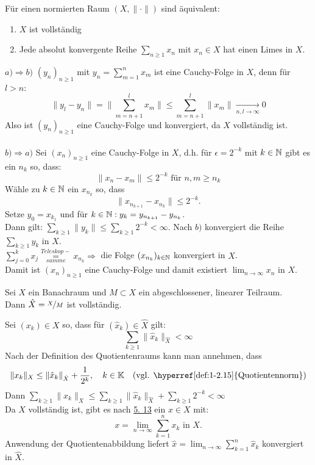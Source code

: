 \begin{lemma} \label{lemma:5.13}
	Für einen normierten Raum $(X, \| \cdot \|)$ sind äquivalent:
	\begin{enumerate}[label=\alph*\upshape)]
		\item $X$ ist vollständig
		\item Jede absolut konvergente Reihe $\sum_{n \geq 1} x_{n}$ mit $x_{n} \in X$ hat einen Limes in $X$.
	\end{enumerate}	
\end{lemma}

\begin{beweis}
	$a) \Rightarrow b)$	$(y_{n})_{n \geq 1}$ mit $y_{n} = \sum_{m = 1}^{n} x_{m}$ ist eine Cauchy-Folge in $X$, denn für $l > n$:
		\[ \| y_{l} - y_{n} \| = \| \sum_{m = n + 1}^{l} x_{m} \| \leq \sum_{m = n + 1}^{l} \| x_{m} \| \xrightarrow[n, l \rightarrow \infty]{} 0 \]
	Also ist $(y_{n})_{n \geq 1}$ eine Cauchy-Folge und konvergiert, da $X$ vollständig ist. \\ \\
	$b) \Rightarrow a)$	Sei $(x_{n})_{n \geq 1}$ eine Cauchy-Folge in $X$, d.h. für $\epsilon = 2^{-k}$ mit $k \in \mathbb{N}$ gibt es ein $n_{k}$ so, dass:
		\[ \| x_{n} - x_{m} \| \leq 2^{-k} \text{ für } n, m \geq n_{k} \]
		Wähle zu $k \in \mathbb{N}$ ein $x_{n_{k}}$ so, dass
		\[ \| x_{n_{k+1}} - x_{n_{k}} \| \leq 2^{-k}.\]
		Setze $y_{0} = x_{k_{1}}$ und für $k \in \mathbb{N}: y_{k} = y_{n_{k+1}} - y_{n_{k}}$. \\
		Dann gilt: $\sum_{k \geq 1} \| y_{k} \| \leq \sum_{k \geq 1} 2^{-k} < \infty$. Nach $b)$ konvergiert die Reihe $\sum_{k \geq 1} y_{k}$ in $X$. \\
		$\sum_{j = 0}^{k} x_{j} \underset{summe}{\overset{Teleskop-}{=}}x_{n_{k}} \Rightarrow $ die Folge $(x_{n_{k}})_{k \in \mathbb{N}}$ konvergiert in $X$. \\
		Damit ist $(x_{n})_{n \geq 1}$ eine Cauchy-Folge und damit existiert $\lim_{n \rightarrow \infty} x_{n}$ in $X$.
\end{beweis}


\begin{kor}
	Sei $X$ ein Banachraum und $M \subset X$ ein abgeschlossener, linearer Teilraum. \\
	Dann $\hat X = \nicefrac{X}{M}$ ist vollständig.
	\begin{beweis}	
		Sei $(x_{k}) \in X$ so, dass für $(\hat x_{k}) \in \hat X$ gilt:
		\[ \sum_{k \geq 1} \| \hat x_{k} \|_{\hat X} < \infty \]
		Nach der Definition des Quotientenraums kann man annehmen, dass
		\[ \| x_{k} \|_{X} \leq \| \hat x_{k} \|_{\hat X} + \frac{1}{2^{k}}, \quad k \in \MdK \quad \text{(vgl. \hyperref[def:1-2.15]{Quotientennorm})} \]
		Dann $\sum_{k \geq 1} \| x_{k} \|_{X} \leq \sum_{k \geq 1} \| \hat x_{k} \|_{\hat X} + \sum_{k \geq 1} 2^{-k} < \infty$ \\
		Da $X$ vollständig ist, gibt es nach \hyperref[lemma:1-5.13]{5. 13} ein $x \in X$ mit:
			\[ x = \lim_{n \rightarrow \infty} \sum_{k = 1}^{n} x_{k} \text{ in } X. \]
		Anwendung der Quotientenabbildung liefert $\hat x = \lim_{n \rightarrow \infty} \sum_{k = 1}^{n} \hat x_{k}$ konvergiert in $\hat X$.
	\end{beweis}
\end{kor}


